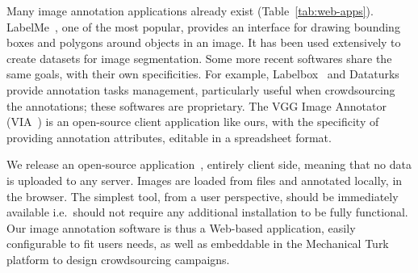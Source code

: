 
Many image annotation applications already exist (Table~\ref{tab:web-apps}).
LabelMe~\cite{russell2008labelme}, one of the most popular,
provides an interface for drawing bounding boxes and polygons
around objects in an image.
It has been used extensively to create datasets for image segmentation.
Some more recent softwares share the same goals, with their own specificities.
For example, Labelbox~\cite{labelbox} and
Dataturks~\cite{dataturks} provide annotation tasks management,
particularly useful when crowdsourcing the annotations;
these softwares are proprietary.
The VGG Image Annotator (VIA~\cite{dutta2016via})
is an open-source client application like ours,
with the specificity of providing annotation attributes,
editable in a spreadsheet format.

We release an open-source application~\cite{annotationappgithub},
entirely client side, meaning that no data is uploaded to any server.
Images are loaded from files and annotated locally, in the browser.
The simplest tool, from a user perspective, should be immediately available
i.e.\ should not require any additional installation to be fully functional.
Our image annotation software is thus a Web-based application,
easily configurable to fit users needs, as well as
embeddable in the Mechanical Turk platform to design crowdsourcing campaigns.

